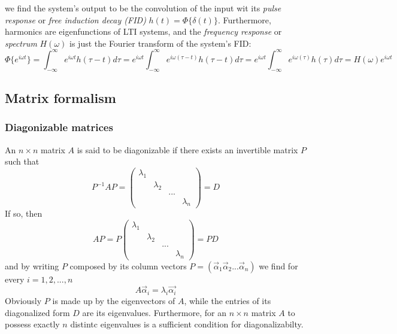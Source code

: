 \documentclass[11.5pt,a4paper]{article}
\begin{document}
we find the system's output to be the convolution of the input wit its \emph{pulse response} or \emph{free induction decay (FID)} $h(t) = \Phi\{\delta(t)\}$. 
Furthermore, harmonics are eigenfunctions of LTI systems, and the \emph{frequency response} or \emph{spectrum} $H(\omega)$ is just the Fourier transform of the system's FID:
\begin{equation}
	\Phi\{e^{i\omega t}\} = \int_{-\infty}^{\infty} e^{i\omega t} h(\tau-t) d\tau =  e^{i\omega t} \int_{-\infty}^{\infty} e^{i\omega (\tau-t)} h(\tau-t) d\tau =  e^{i\omega t} \int_{-\infty}^{\infty} e^{i\omega (\tau)} h(\tau) d\tau = H(\omega) e^{i \omega t}
\end{equation}


\subsection{Matrix formalism}

\subsubsection{Diagonizable matrices}
An $n \times n$ matrix $A$ is said to be diagonizable if there exists an invertible matrix $P$ such that
\begin{equation}
 P^{-1} A P = \begin{pmatrix} 
		\lambda_1 & & & \\
		& \lambda_2 & & \\
		& & \text{...} & \\
		& & & \lambda_n
              \end{pmatrix} = D
\end{equation}
If so, then 
\begin{equation}
 A P = P \begin{pmatrix} 
		\lambda_1 & & & \\
		& \lambda_2 & & \\
		& & \text{...} & \\
		& & & \lambda_n
              \end{pmatrix} = P D
\end{equation}
and by writing $P$ composed by its column vectors $P = ( \vec{\alpha}_1 \vec{\alpha}_2 ... \vec{\alpha}_n)$ we find for every $i = 1,2,...,n$
\begin{equation}
 A \vec{\alpha}_i = \lambda_i \vec{\alpha_i}
\end{equation}
Obviously $P$ is made up by the eigenvectors of $A$, while the entries of its diagonalized form $D$ are its eigenvalues. Furthermore, for an $n \times n$ matrix $A$ to possess exactly $n$ distintc eigenvalues is a sufficient condition for diagonalizabilty.
\end{document}
